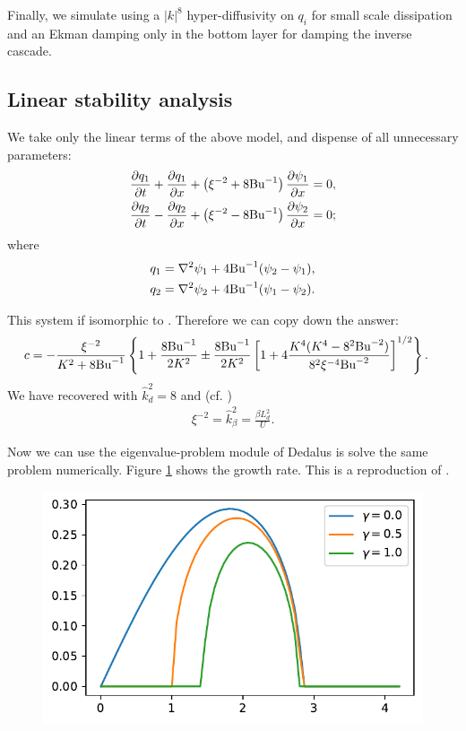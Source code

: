 Finally, we simulate using a $|k|^8$ hyper-diffusivity on $q_i$ for small scale dissipation and an Ekman damping only in the bottom layer for damping the inverse cascade.

\subsection{Linear stability analysis}
We take only the linear terms of the above model, and dispense of all unnecessary parameters:
\begin{align}
    &\frac{\partial q_1}{\partial t}+\frac{\partial q_1}{\partial x}+\left(\xi^{-2}+8\text{Bu}^{-1}\right)\frac{\partial\psi_1}{\partial x} = 0,\label{eq:2lay_sym_eq1_lin}\\
    &\frac{\partial q_2}{\partial t}-\frac{\partial q_2}{\partial x}+\left(\xi^{-2}-8\text{Bu}^{-1}\right)\frac{\partial\psi_2}{\partial x} = 0;\label{eq:2lay_sym_eq2_lin}
\end{align}
where
\begin{align}
    q_1 &= \nabla^2\psi_1 + 4\text{Bu}^{-1}(\psi_2-\psi_1),\label{eq:2lay_sym_pv1_lin}\\
    q_2 &= \nabla^2\psi_2 + 4\text{Bu}^{-1}(\psi_1-\psi_2).\label{eq:2lay_sym_pv2_lin}
\end{align}

This system if isomorphic to \cite[(9.107)]{Vallis_17}. Therefore we can copy down the answer:
\begin{align}
    c &= -\frac{\xi^{-2}}{K^2+8\text{Bu}^{-1}}\left\{ 1+\frac{8\text{Bu}^{-1}}{2K^2}\pm\frac{8\text{Bu}^{-1}}{2K^2}\left[1+4\frac{K^4(K^4-8^2\text{Bu}^{-2})}{8^2\xi^{-4}\text{Bu}^{-2}}\right]^{1/2} \right\}.
\end{align}
We have recovered \cite[(9.114)]{Vallis_17} with $\hat{k}_d^2 = 8$ and (cf. \cite[(9.115)]{Vallis_17})
\begin{align}
    \xi^{-2} = \hat{k}_\beta^2 = \frac{\beta L_d^2}{U}.
\end{align}

Now we can use the eigenvalue-problem module of Dedalus is solve the same problem numerically. Figure \ref{fig:2Lay_linstab} shows the growth rate. This is a reproduction of \cite[Fig. 9.14]{Vallis_17}.
\begin{figure}
    \centering
    \includegraphics{plot_snap/figs/2Lay_linstab}
    \caption{}
    \label{fig:2Lay_linstab}
\end{figure}


